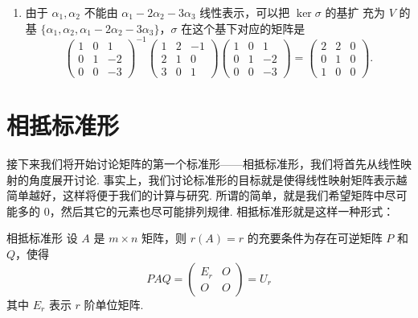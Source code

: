\begin{solution}
\begin{enumerate}
        \item 由于 $\alpha_{1}, \alpha_{2}$ 不能由 $\alpha_{1}-2 \alpha_{2}-3 \alpha_{3}$ 线性表示，可以把 $\ker \sigma$ 的基扩 充为 $V$ 的基 $\{\alpha_{1}, \alpha_{2}, \alpha_{1}-2 \alpha_{2}-3 \alpha_{3}\}$，$\sigma$ 在这个基下对应的矩阵是
              \[\begin{pmatrix}
                      1 & 0 & 1  \\
                      0 & 1 & -2 \\
                      0 & 0 & -3
                  \end{pmatrix}^{-1}\begin{pmatrix}
                      1 & 2 & -1 \\
                      2 & 1 & 0  \\
                      3 & 0 & 1
                  \end{pmatrix}\begin{pmatrix}
                      1 & 0 & 1  \\
                      0 & 1 & -2 \\
                      0 & 0 & -3
                  \end{pmatrix}=\begin{pmatrix}
                      2 & 2 & 0 \\
                      0 & 1 & 0 \\
                      1 & 0 & 0
                  \end{pmatrix}.\]
    \end{enumerate}
\end{solution}

\section{相抵标准形}

接下来我们将开始讨论矩阵的第一个标准形——相抵标准形，我们将首先从线性映射的角度展开讨论. 事实上，我们讨论标准形的目标就是使得线性映射矩阵表示越简单越好，这样将便于我们的计算与研究. 所谓的简单，就是我们希望矩阵中尽可能多的 $0$，然后其它的元素也尽可能排列规律. 相抵标准形就是这样一种形式：

\begin{theorem}{}{相抵标准形}
    设 $A$ 是 $m\times n$ 矩阵，则 $r(A) = r$ 的充要条件为存在可逆矩阵 $P$ 和 $Q$，使得
    \[PAQ = \begin{pmatrix}
            E_r & O \\ O & O
        \end{pmatrix} = U_r\]
    其中 $E_r$ 表示 $r$ 阶单位矩阵.
\end{theorem}

